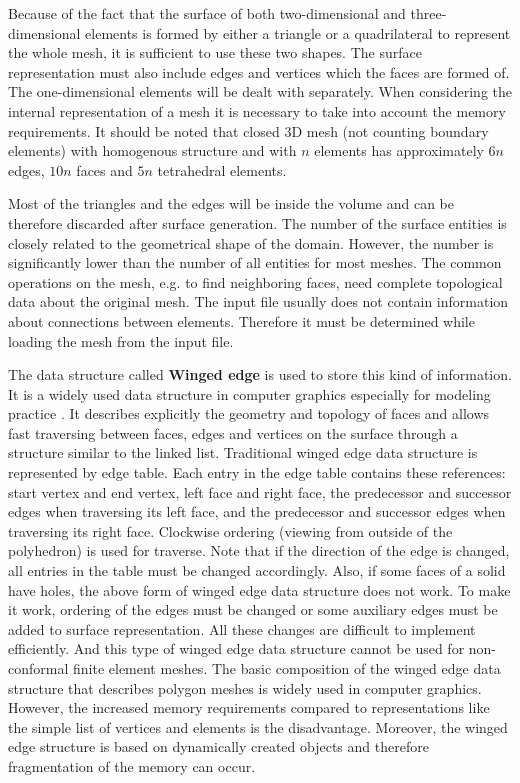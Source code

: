 Because of the fact that the surface of both two-dimensional and three-dimensional elements is formed by either a triangle or a quadrilateral to represent the whole mesh, it is sufficient to use these two shapes. The surface representation must also include edges and vertices which the faces are formed of. The one-dimensional elements will be dealt with separately. When considering the internal representation of a mesh it is necessary to take into account the memory requirements. It should be noted that closed 3D mesh (not counting boundary elements) with homogenous structure and with $n$ elements has approximately $6n$ edges, $10n$ faces and $5n$ tetrahedral elements.

Most of the triangles and the edges will be inside the volume and can be therefore discarded after surface generation. The number of the surface entities is closely related to the geometrical shape of the domain. However, the number is significantly lower than the number of all entities for most meshes. The common operations on the mesh, e.g. to find neighboring faces, need complete topological data about the original mesh. The input file usually does not contain information about connections between elements. Therefore it must be determined while loading the mesh from the input file.

The data structure called \textbf{Winged edge} is used to store this kind of information. It is a widely used data structure in computer graphics especially for modeling practice \cite{Baumgart1972,Floriani2005,Shirley2009}. It describes explicitly the geometry and topology of faces and allows fast traversing between faces, edges and vertices on the surface through a structure similar to the linked list. Traditional winged edge data structure is represented by edge table. Each entry in the edge table contains these references: start vertex and end vertex, left face and right face, the predecessor and successor edges when traversing its left face, and the predecessor and successor edges when traversing its right face. Clockwise ordering (viewing from outside of the polyhedron) is used for traverse. Note that if the direction of the edge is changed, all entries in the table must be changed accordingly. Also, if some faces of a solid have holes, the above form of winged edge data structure does not work. To make it work, ordering of the edges must be changed or some auxiliary edges must be added to surface representation. All these changes are difficult to implement efficiently. And this type of winged edge data structure cannot be used for non-conformal finite element meshes. The basic composition of the winged edge data structure that describes polygon meshes is widely used in computer graphics. However, the increased memory requirements compared to representations like the simple list of vertices and elements is the disadvantage. Moreover, the winged edge structure is based on dynamically created objects and therefore fragmentation of the memory can occur.

